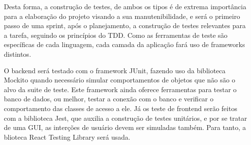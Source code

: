 Desta forma, a construção de testes, de ambos os tipos é de extrema
importância para a elaboração do projeto visando a sua
manutenibilidade, e será o primeiro passo de uma sprint, após o
planejamento, a construção de testes relevantes para a tarefa,
seguindo os princípios do TDD\cite{TDD}. Como as ferramentas de teste são
específicas de cada linguagem, cada camada da aplicação fará uso de
frameworks distintos.

O \gls{backend} será testado com o framework JUnit, fazendo uso da
biblioteca Mockito quando necessário simular comportamentos de objetos
que não são o alvo da suite de teste. Este framework ainda oferece
ferramentas para testar o banco de dados, ou melhor, testar a conexão
com o banco e verificar o comportamento das classes de acesso a ele.
Já os teste de \gls{frontend} serão feitos com a biblioteca Jest,
que auxilia a construção de testes unitários, e por se tratar de uma
\gls{GUI}, as interções de usuário devem ser simuladas também. Para tanto, a
blioteca React Testing Library será usada.

